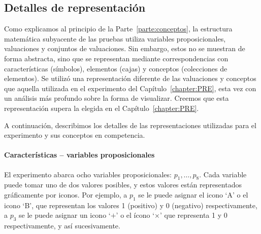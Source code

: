 \subsection{Detalles de representación}\label{sub:experimentdetails} 


Como explicamos al principio de la Parte~\ref{parte:conceptos}, la estructura matemática subyacente de las pruebas utiliza variables proposicionales, valuaciones y conjuntos de valuaciones. Sin embargo, estos no se muestran de forma abstracta, sino que se representan mediante correspondencias con características (símbolos), elementos (cajas) y conceptos (colecciones de elementos). Se utilizó una representación diferente de las valuaciones y conceptos que aquella utilizada en el experimento del Capítulo~\ref{chapter:PRE}, esta vez con un análisis más profundo sobre la forma de visualizar. Creemos que esta representación supera la elegida en el Capítulo~\ref{chapter:PRE}.

A continuación, describimos los detalles de las representaciones utilizadas para el experimento y sus conceptos en competencia.

\paragraph{Características -- variables proposicionales}

El experimento abarca ocho variables proposicionales: $ p_1, \dots, p_8 $. Cada variable puede tomar uno de dos valores posibles, y estos valores están representados gráficamente por iconos. Por ejemplo, a $ p_1 $ se le puede asignar el icono `A' o el icono `B', que representan los valores 1 (positivo) y 0 (negativo) respectivamente, a $ p_3 $ se le puede asignar un icono `$ + $' o el ícono `$\times$' que representa 1 y 0 respectivamente, y así sucesivamente.

